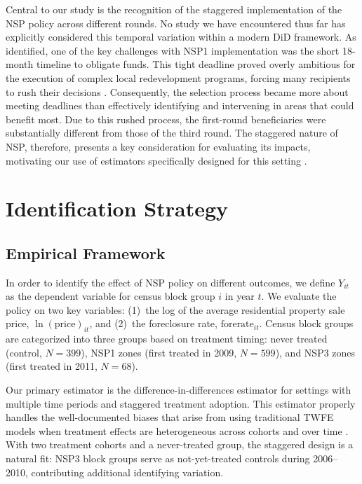 \documentclass[12pt,authoryear]{elsarticle}
\begin{document}
Central to our study is the recognition of the staggered implementation of the NSP policy across different rounds. No study we have encountered thus far has explicitly considered this temporal variation within a modern DiD framework. As \citet{immergluck2013} identified, one of the key challenges with NSP1 implementation was the short 18-month timeline to obligate funds. This tight deadline proved overly ambitious for the execution of complex local redevelopment programs, forcing many recipients to rush their decisions \citep{immergluck2012}. Consequently, the selection process became more about meeting deadlines than effectively identifying and intervening in areas that could benefit most. Due to this rushed process, the first-round beneficiaries were substantially different from those of the third round. The staggered nature of NSP, therefore, presents a key consideration for evaluating its impacts, motivating our use of estimators specifically designed for this setting \citep{callaway2021,wooldridge2023,goodmanbacon2021}.


\section{Identification Strategy}
\label{sec:identification}

\subsection{Empirical Framework}

In order to identify the effect of NSP policy on different outcomes, we define $Y_{it}$ as the dependent variable for census block group $i$ in year $t$. We evaluate the policy on two key variables: (1)~the log of the average residential property sale price, $\ln(\text{price})_{it}$, and (2)~the foreclosure rate, $\text{forerate}_{it}$. Census block groups are categorized into three groups based on treatment timing: never treated (control, $N = 399$), NSP1 zones (first treated in 2009, $N = 599$), and NSP3 zones (first treated in 2011, $N = 68$).

Our primary estimator is the \citet{callaway2021} difference-in-differences estimator for settings with multiple time periods and staggered treatment adoption. This estimator properly handles the well-documented biases that arise from using traditional TWFE models when treatment effects are heterogeneous across cohorts and over time \citep{dechaisemartin2020,goodmanbacon2021,roth2023}. With two treatment cohorts and a never-treated group, the staggered design is a natural fit: NSP3 block groups serve as not-yet-treated controls during 2006--2010, contributing additional identifying variation.
\end{document}
